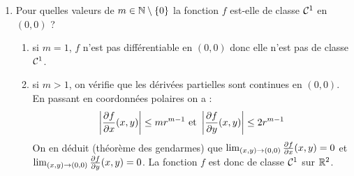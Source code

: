 \documentclass[a4paper]{article}
\begin{document}
\begin{enumerate}
\begin{enumerate}
			\item Pour quelles valeurs de $m\in\mathbb{N}\setminus \left\{ 0 \right\}$ la fonction $f$ est-elle de classe $\mathcal{C}^{1}$ en $(0, 0)$ ?
				\begin{enumerate}
					\item si $m = 1$, $f$ n'est pas différentiable en $(0, 0)$ donc elle n'est pas de classe $\mathcal{C}^{1}$.
					\item si $m>1$, on vérifie que les dérivées partielles sont continues en $(0,0)$. En passant en coordonnées polaires  on a :
						\[
							\left\lvert	\frac{\partial f}{\partial x}(x,y) \right\rvert \leq m r^{m-1} \text{ et } \left\lvert	\frac{\partial f}{\partial y}(x,y) \right\rvert \leq 2 r^{m-1} 
						\]
						On en déduit (théorème des gendarmes) que $\lim_{(x,y) \to (0,0)} \frac{\partial f}{\partial x}(x,y) =  0 $ et $\lim_{(x,y) \to (0,0)} \frac{\partial f}{\partial y}(x,y) =  0 $. La fonction $f$ est donc de classe $\mathcal{C}^{1}$ sur $\mathbb{R}^2$.
				\end{enumerate}


		\end{enumerate}
\end{enumerate}

\end{document}
